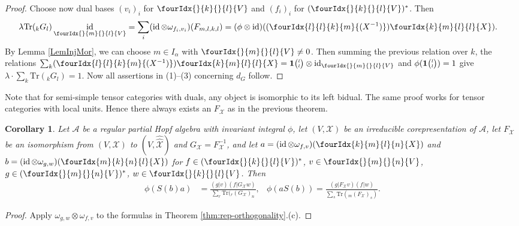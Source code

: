 \documentclass[10pt]{article}
\DeclareMathOperator{\id}{id}
\newcommand{\dual}[1]{#1^{*}}
\newcommand{\dualco}[1]{\hat{#1}}
\newcommand{\Tr}{\mathrm{Tr}}
\newcommand{\GrDA}[3]{{}_{#2}#1_{#3}} %
\newcommand{\Grt}[3]{#1{\tiny {\begin{pmatrix} #2\\#3\end{pmatrix}}}}
\newcommand{\UnitC}[2]{\Grt{\mathbf{1}}{#1}{#2}}
\newcommand{\Gr}[5]{\fourIdx{#2}{#4}{#3}{#5}{#1}}%
\newcommand{\Gru}[3]{\Gr{#1}{}{}{#2}{#3}}
\newtheorem{Cor}[Theorem]{Corollary}
\theoremstyle{definition}
\numberwithin{equation}{section}
\begin{document}
\begin{proof}
  Choose now dual  bases
  $(v_{i})_{i}$ for $\Gru{V}{k}{l}$ and $(f_{i})_{i}$ for  $\dual{(\Gru{V}{k}{l})}$. Then
  \begin{align*}
    \lambda   \Tr( \GrDA{G}{k}{l}) \id_{\Gru{V}{m}{l}}
 &= \sum_{i} (\id \otimes
    \omega_{f_{i},v_{i}})(F_{m,l,k,l}) = (\phi \otimes
    \id)((\Gr{(X^{-1})}{l}{k}{l}{m}) \Gr{X}{k}{l}{m}{l}).
  \end{align*}
   By Lemma \ref{LemInjMor}, we can choose $m\in I_{\alpha}$ with $\Gru{V}{m}{l}\neq 0$.   Then summing the previous relation over $k$, the relations $\sum_{k}
  (\Gr{(X^{-1})}{l}{k}{l}{m}) \Gr{X}{k}{l}{m}{l} = \UnitC{l}{l}
  \otimes \id_{\Gru{V}{m}{l}}$ and
  $\phi(\UnitC{l}{l})=1$ give $\lambda \cdot  \sum_{k} \Tr(\GrDA{G}{k}{l}) = 1.$
Now all assertions in (1)--(3) concerning $d_G$ follow.
\end{proof}

Note that for semi-simple tensor categories with duals, any object is isomorphic to its left bidual. The same proof works for tensor categories with local units. Hence there always exists an $F_{\mathscr{X}}$ as in the previous theorem. 

\begin{Cor}\label{CorOrth}
  Let $\mathscr{A}$ be a regular partial Hopf algebra with invariant integral $\phi$, let
  $(V,\mathscr{X})$ be an irreducible corepresentation of
  $\mathscr{A}$, let $F_{\mathscr{X}}$ be an isomorphism from
  $(V,\mathscr{X})$ to $(V,\dualco{\dualco{\mathscr{X}}})$ and
  $G_{\mathscr{X}}=F^{-1}_{{\mathscr{X}}}$, and let $a=(\id \otimes
  \omega_{f,v})(\Gr{X}{k}{l}{m}{n})$ and $b=(\id \otimes
  \omega_{g,w})(\Gr{X}{m}{n}{k}{l})$ for
  $f \in   \dual{(\Gru{V}{k}{l})}$, $v \in\Gru{V}{m}{n}$, $g \in
  \dual{(\Gru{V}{m}{n})}$, $w \in  \Gru{V}{k}{l}$.  Then
\begin{align*}
  \phi(S(b)a) &= \frac{(g|v)(f|G_{\mathscr{X}}w)}{\sum_{r}
    \Tr(\GrDA{(G_{\mathscr{X}})}{r}{n}}, & \phi(aS(b)) = \frac{(g|F_{\mathscr{X}}v)(f|w)}{\sum_{s}
    \Tr(\GrDA{(F_{\mathscr{X}})}{m}{s})}.
\end{align*}
\end{Cor}
\begin{proof}
Apply $\omega_{g,w} \otimes
    \omega_{f,v}$ to the formulas in  Theorem
    \ref{thm:rep-orthogonality}.(c).
\end{proof}
\end{document}
